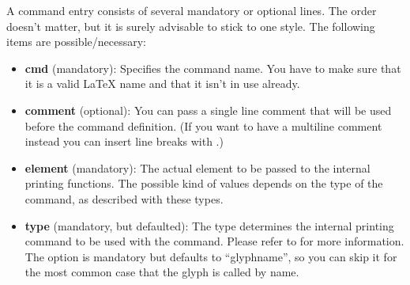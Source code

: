 \documentclass{OLLbook}
\begin{document}
\medskip
A command entry consists of several mandatory or optional lines.
The order doesn't matter, but it is surely advisable to stick to one style.
The following items are possible/necessary:
\begin{itemize}
	\item \textsf{\textbf{cmd} (mandatory)}: Specifies the command name. 
	You have to make sure that it is a valid \LaTeX{} name and that it isn't in use already.
	\item \textsf{\textbf{comment} (optional)}: You can pass a single line comment that will be used before the command definition.
	(If you want to have a multiline comment instead you can insert line breaks with .)
	\item \textsf{\textbf{element} (mandatory)}: The actual element to be passed to the internal printing functions.
	The possible kind of values depends on the type of the command, as described with these types.
	\item \textsf{\textbf{type} (mandatory, but defaulted)}: The type determines the internal printing command to be used with the command.
	Please refer to  for more information.
	The option is mandatory but defaults to “glyphname”, so you can skip it for the most common case that the glyph is called by name.


\end{itemize}
\end{document}
